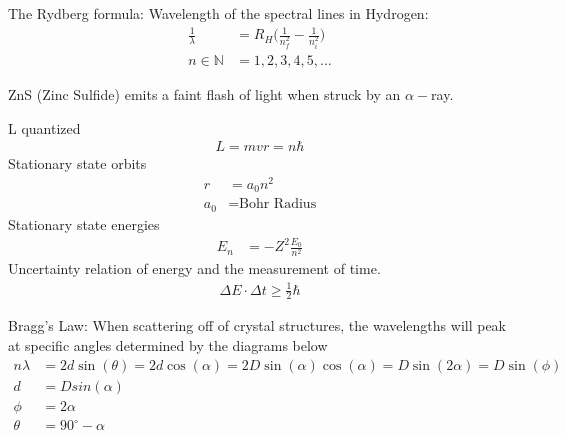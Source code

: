 \begin{multicols}{2}
The Rydberg formula: Wavelength of the spectral lines in Hydrogen:
\begin{align}
\frac{1}{\lambda} &=R_H \bigg(\frac{1}{n_f^2}-\frac{1}{n_i^2} \bigg) \\
n \in \mathbb{N} &= 1,2,3,4,5,\dots 
\end{align}

\begin{note}
	ZnS (Zinc Sulfide) emits a faint flash of light when struck by an $\alpha -$ray.
\end{note}
L quantized
\begin{align}
L=mvr=n\hbar
\end{align}
Stationary state orbits
\begin{align}
r &=a_0n^2 \\
a_0 &= \textrm{Bohr Radius}
\end{align}
Stationary state energies
\begin{align}
E_n &=-Z^2\frac{E_0}{n^2}
\end{align}
Uncertainty relation of energy and the measurement of time.
\begin{align}
\Delta E \cdot \Delta t \geq \frac{1}{2} \hbar
\end{align}
\end{multicols}
Bragg's Law: When scattering off of crystal structures, the wavelengths will peak at specific angles determined by the diagrams below
\begin{align}
n\lambda &=2d\sin(\theta)=2d\cos(\alpha) = 2D\sin(\alpha)\cos(\alpha) =D\sin(2\alpha) = D\sin(\phi)\\
d &= Dsin(\alpha) \\
\phi &= 2 \alpha \\
\theta &= 90^\circ - \alpha
\end{align} 
